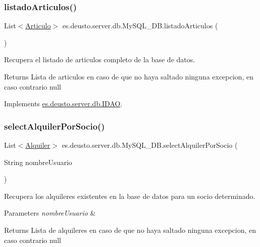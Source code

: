\subsubsection{\texorpdfstring{listadoArticulos()}{listadoArticulos()}}
{\footnotesize\ttfamily List$<$\mbox{\hyperlink{classes_1_1deusto_1_1client_1_1data_1_1_articulo}{Articulo}}$>$ es.\+deusto.\+server.\+db.\+My\+S\+Q\+L\+\_\+\+D\+B.\+listado\+Articulos (\begin{DoxyParamCaption}{ }\end{DoxyParamCaption})}

Recupera el listado de articulos completo de la base de datos. \begin{DoxyReturn}{Returns}
Lista de articulos en caso de que no haya saltado ninguna excepcion, en caso contrario null 
\end{DoxyReturn}


Implements \mbox{\hyperlink{interfacees_1_1deusto_1_1server_1_1db_1_1_i_d_a_o_a7c573cd5b9d26960fc8eeeec4db1e5e5}{es.\+deusto.\+server.\+db.\+I\+D\+AO}}.

\mbox{\label{classes_1_1deusto_1_1server_1_1db_1_1_my_s_q_l___d_b_a0b29a31e081a796511d06da22eece230}} 
\subsubsection{\texorpdfstring{selectAlquilerPorSocio()}{selectAlquilerPorSocio()}}
{\footnotesize\ttfamily List$<$\mbox{\hyperlink{classes_1_1deusto_1_1client_1_1data_1_1_alquiler}{Alquiler}}$>$ es.\+deusto.\+server.\+db.\+My\+S\+Q\+L\+\_\+\+D\+B.\+select\+Alquiler\+Por\+Socio (\begin{DoxyParamCaption}\item[{String}]{nombre\+Usuario }\end{DoxyParamCaption})}

Recupera los alquileres existentes en la base de datos para un socio determinado. 
\begin{DoxyParams}{Parameters}
{\em nombre\+Usuario} & \\
\hline
\end{DoxyParams}
\begin{DoxyReturn}{Returns}
Lista de alquileres en caso de que no haya saltado ninguna excepcion, en caso contrario null 
\end{DoxyReturn}


